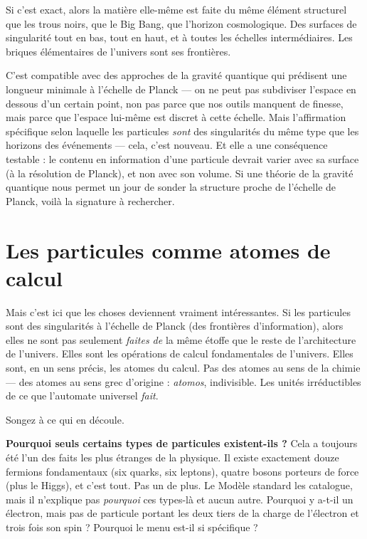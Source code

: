 \documentclass[11pt, twoside, openright]{book}
\begin{document}
Si c'est exact, alors la matière elle-même est faite du même élément structurel que les trous noirs, que le Big Bang, que l'horizon cosmologique. Des surfaces de singularité tout en bas, tout en haut, et à toutes les échelles intermédiaires. Les briques élémentaires de l'univers sont ses frontières.

C'est compatible avec des approches de la gravité quantique qui prédisent une longueur minimale à l'échelle de Planck --- on ne peut pas subdiviser l'espace en dessous d'un certain point, non pas parce que nos outils manquent de finesse, mais parce que l'espace lui-même est discret à cette échelle. Mais l'affirmation spécifique selon laquelle les particules \textit{sont} des singularités du même type que les horizons des événements --- cela, c'est nouveau. Et elle a une conséquence testable : le contenu en information d'une particule devrait varier avec sa surface (à la résolution de Planck), et non avec son volume. Si une théorie de la gravité quantique nous permet un jour de sonder la structure proche de l'échelle de Planck, voilà la signature à rechercher.

\section*{Les particules comme atomes de calcul}

Mais c'est ici que les choses deviennent vraiment intéressantes. Si les particules sont des singularités à l'échelle de Planck (des frontières d'information), alors elles ne sont pas seulement \textit{faites de} la même étoffe que le reste de l'architecture de l'univers. Elles sont les opérations de calcul fondamentales de l'univers. Elles sont, en un sens précis, les atomes du calcul. Pas des atomes au sens de la chimie --- des atomes au sens grec d'origine : \textit{atomos}, indivisible. Les unités irréductibles de ce que l'automate universel \textit{fait}.

Songez à ce qui en découle.

\textbf{Pourquoi seuls certains types de particules existent-ils ?} Cela a toujours été l'un des faits les plus étranges de la physique. Il existe exactement douze fermions fondamentaux (six quarks, six leptons), quatre bosons porteurs de force (plus le Higgs), et c'est tout. Pas un de plus. Le Modèle standard les catalogue, mais il n'explique pas \textit{pourquoi} ces types-là et aucun autre. Pourquoi y a-t-il un électron, mais pas de particule portant les deux tiers de la charge de l'électron et trois fois son spin ? Pourquoi le menu est-il si spécifique ?
\end{document}

